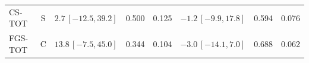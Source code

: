 \begin{longtable}{lcp{37mm}rrp{37mm}rr}
CS-TOT & S & \(2.7\,[-12.5,39.2]\) & 0.500 & 0.125 & \(-1.2\,[-9.9,17.8]\) & 0.594 & 0.076\\
FGS-TOT & C & \(13.8\,[-7.5,45.0]\) & 0.344 & 0.104 & \(-3.0\,[-14.1,7.0]\) & 0.688 & 0.062\\

\end{longtable}
